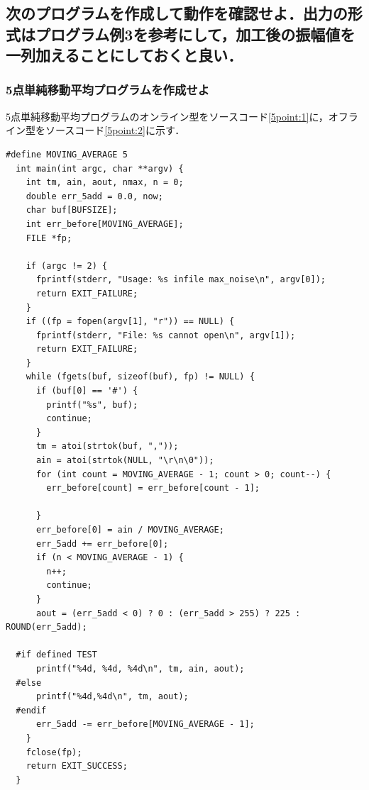 \documentclass[titlepage]{jarticle}
\begin{document}
\subsection{次のプログラムを作成して動作を確認せよ．出力の形式はプログラム例3を参考にして，加工後の振幅値を一列加えることにしておくと良い．}
\setcounter{subsubsection}{2}
\subsubsection{5点単純移動平均プログラムを作成せよ}
5点単純移動平均プログラムのオンライン型をソースコード\ref{5point:1}に，オフライン型をソースコード\ref{5point:2}に示す．
\begin{lstlisting}[caption=mvave5-1.c,label=5point:1]
  #define MOVING_AVERAGE 5
  int main(int argc, char **argv) {
    int tm, ain, aout, nmax, n = 0;
    double err_5add = 0.0, now;
    char buf[BUFSIZE];
    int err_before[MOVING_AVERAGE];
    FILE *fp;
  
    if (argc != 2) {
      fprintf(stderr, "Usage: %s infile max_noise\n", argv[0]);
      return EXIT_FAILURE;
    }
    if ((fp = fopen(argv[1], "r")) == NULL) {
      fprintf(stderr, "File: %s cannot open\n", argv[1]);
      return EXIT_FAILURE;
    }
    while (fgets(buf, sizeof(buf), fp) != NULL) {
      if (buf[0] == '#') {              
        printf("%s", buf);
        continue;
      }
      tm = atoi(strtok(buf, ","));
      ain = atoi(strtok(NULL, "\r\n\0"));
      for (int count = MOVING_AVERAGE - 1; count > 0; count--) {
        err_before[count] = err_before[count - 1];

      }
      err_before[0] = ain / MOVING_AVERAGE;
      err_5add += err_before[0];
      if (n < MOVING_AVERAGE - 1) {
        n++;
        continue;
      }
      aout = (err_5add < 0) ? 0 : (err_5add > 255) ? 225 : ROUND(err_5add);
  
  #if defined TEST
      printf("%4d, %4d, %4d\n", tm, ain, aout);
  #else
      printf("%4d,%4d\n", tm, aout);
  #endif
      err_5add -= err_before[MOVING_AVERAGE - 1];
    }
    fclose(fp);
    return EXIT_SUCCESS;
  }
\end{lstlisting}
\end{document}
